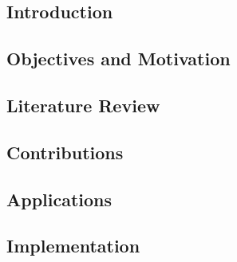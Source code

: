 \documentclass[11pt]{report}
\begin{document}
\begin{doublespace}

\body


\chapter{Introduction}

\indent


\section{Objectives and Motivation}

\indent


\section{Literature Review}

\indent



\section{Contributions}

\indent



\section{Applications}

\indent



\section{Implementation}

\indent




\end{doublespace}
\end{document}
